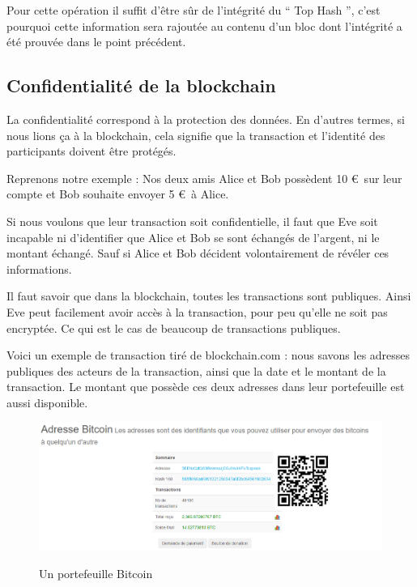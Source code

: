 \documentclass[12pt, a4paper, oneside]{book}
\begin{document}
    Pour cette opération il suffit d'être sûr de l’intégrité du \hyphenquote{french}{ Top Hash }, c’est pourquoi cette information sera rajoutée au contenu d’un bloc dont l'intégrité a été prouvée dans le point précédent.\cite{merkle}
    
    \subsection {Confidentialité de la blockchain}
    La confidentialité correspond à la protection des données. En d’autres termes, si nous lions ça à la blockchain, cela signifie que la transaction et l’identité des participants doivent être protégés. 
    
    Reprenons notre exemple :
    Nos deux amis Alice et Bob possèdent 10 \euro~sur leur compte et Bob souhaite envoyer 5 \euro~à Alice. 
    
    Si nous voulons que leur transaction soit confidentielle, il faut que Eve soit incapable ni d’identifier que Alice et Bob se sont échangés de l’argent, ni le montant échangé. Sauf si Alice et Bob décident volontairement de révéler ces informations.
    
    Il faut savoir que dans la blockchain, toutes les transactions sont publiques. Ainsi Eve peut facilement avoir accès à la transaction, pour peu qu’elle ne soit pas encryptée. Ce qui est le cas de beaucoup de transactions publiques. 
    
    Voici un exemple de transaction tiré de blockchain.com : nous savons les adresses publiques des acteurs de la transaction, ainsi que la date et le montant de la transaction. Le montant que possède ces deux adresses dans leur portefeuille est aussi disponible.

    \begin{figure}[H]
        \begin{center}
          \includegraphics[width=\textwidth]{images/portefeuille.png}
          \label{fig:portefeuille}
          \caption{Un portefeuille Bitcoin}
        \end{center}
    \end{figure}
\end{document}

